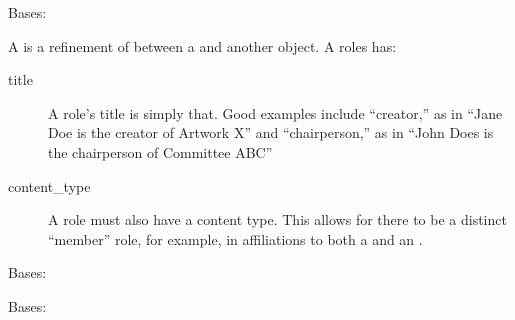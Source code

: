 \documentclass[letterpaper,10pt,english]{sphinxmanual}
\begin{document}
\begin{fulllineitems}
\label{generated/apps.reporting.models:apps.reporting.models.Role}
Bases: 

A  is a refinement of  between a 
and another object.  A roles has:
\begin{description}
\item[{title}] \leavevmode
A role's title is simply that.  Good examples include ``creator,'' as in
``Jane Doe is the creator of Artwork X'' and ``chairperson,'' as in
``John Does is the chairperson of Committee ABC''

\item[{content\_type}] \leavevmode
A role must also have a content type.  This allows for there to be a 
distinct ``member'' role, for example, in affiliations to both a
 and an .

\end{description}


\begin{fulllineitems}
\label{generated/apps.reporting.models:apps.reporting.models.Role.DoesNotExist}
Bases: 

\end{fulllineitems}



\begin{fulllineitems}
\label{generated/apps.reporting.models:apps.reporting.models.Role.MultipleObjectsReturned}
Bases: 

\end{fulllineitems}



\begin{fulllineitems}
\label{generated/apps.reporting.models:apps.reporting.models.Role.affiliations}
\end{fulllineitems}



\end{fulllineitems}
\end{document}
